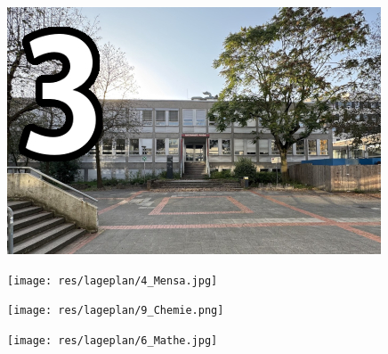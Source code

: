 {\vspace{1ex}

\begin{minipage}[c]{0.45\textwidth}
	\includegraphics[width=\columnwidth]{res/lageplan/3_AP.jpg}
\end{minipage}
\hfill
\begin{minipage}[c]{0.45\textwidth}
	\texttt{[image: res/lageplan/4\_Mensa.jpg]}
\end{minipage}

\begin{minipage}[c]{0.45\textwidth}
	\texttt{[image: res/lageplan/9\_Chemie.png]}
\end{minipage}
\hfill
\begin{minipage}[c]{0.45\textwidth}
	\texttt{[image: res/lageplan/6\_Mathe.jpg]}
\end{minipage}

}
